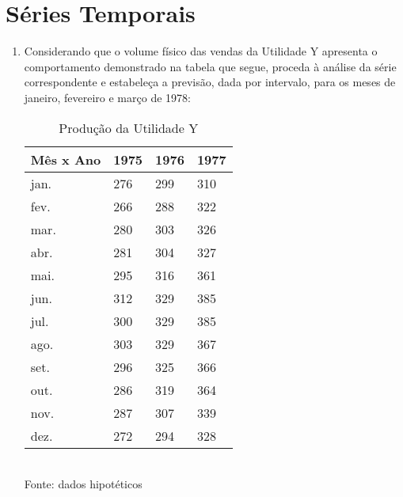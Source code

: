 \chapter{Séries Temporais}

\begin{enumerate}[resume]

\item Considerando que o volume físico das vendas da Utilidade Y apresenta o comportamento demonstrado na tabela que segue, proceda à análise da série correspondente e estabeleça a previsão, dada por intervalo, para os meses de janeiro, fevereiro e março de 1978:
	\begin{table}[!htb]
	\centering
	\caption{Produção da Utilidade Y}
	\vspace{0.5cm}
	\begin{tabular}{llll}
	Mês x Ano & 1975 & 1976 & 1977 \\
	\hline 
	jan. & 276 & 299 & 310 \\
	fev. & 266 & 288 & 322 \\
	mar. & 280 & 303 & 326 \\
	abr. & 281 & 304 & 327 \\
	mai. & 295 & 316 & 361 \\
	jun. & 312 & 329 & 385 \\	
	jul. & 300 & 329 & 385 \\
	ago. & 303 & 329 & 367 \\
	set. & 296 & 325 & 366 \\
	out. & 286 & 319 & 364 \\
	nov. & 287 & 307 & 339 \\
	dez. & 272 & 294 & 328 \\					
	\end{tabular}\\
	Fonte: dados hipotéticos
	\end{table}


\end{enumerate}
